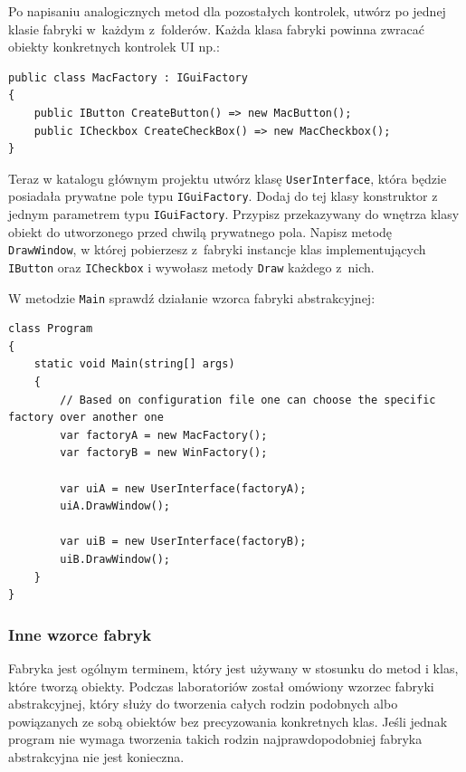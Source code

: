
Po napisaniu analogicznych metod dla pozostałych kontrolek, utwórz po jednej klasie fabryki w~każdym z~folderów. Każda klasa fabryki powinna zwracać obiekty konkretnych kontrolek UI np.:
\begin{lstlisting}
public class MacFactory : IGuiFactory
{
	public IButton CreateButton() => new MacButton();
	public ICheckbox CreateCheckBox() => new MacCheckbox();
}
\end{lstlisting}

Teraz w katalogu głównym projektu utwórz klasę \texttt{UserInterface}, która będzie posiadała prywatne pole typu \texttt{IGuiFactory}. Dodaj do tej klasy konstruktor z jednym parametrem typu \texttt{IGuiFactory}. Przypisz przekazywany do wnętrza klasy obiekt do utworzonego przed chwilą prywatnego pola. Napisz metodę \texttt{DrawWindow}, w której pobierzesz z~fabryki instancje klas implementujących \texttt{IButton} oraz \texttt{ICheckbox} i wywołasz metody \texttt{Draw} każdego z~nich.

W metodzie \texttt{Main} sprawdź działanie wzorca fabryki abstrakcyjnej:
\begin{lstlisting}
class Program
{
	static void Main(string[] args)
	{
		// Based on configuration file one can choose the specific factory over another one
		var factoryA = new MacFactory();
		var factoryB = new WinFactory();
		
		var uiA = new UserInterface(factoryA);
		uiA.DrawWindow();
		
		var uiB = new UserInterface(factoryB);
		uiB.DrawWindow();
	}
}
\end{lstlisting}

\subsubsection{Inne wzorce fabryk}
Fabryka jest ogólnym terminem, który jest używany w stosunku do metod i klas, które tworzą obiekty. Podczas laboratoriów został omówiony wzorzec fabryki abstrakcyjnej, który służy do tworzenia całych rodzin podobnych albo powiązanych ze sobą obiektów bez precyzowania konkretnych klas. Jeśli jednak program nie wymaga tworzenia takich rodzin najprawdopodobniej fabryka abstrakcyjna nie jest konieczna. 

